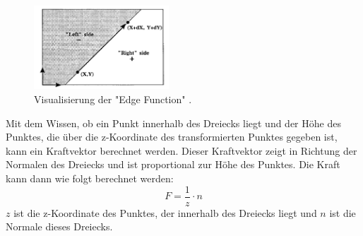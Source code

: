 \documentclass[conference]{IEEEtran}
\begin{document}
\begin{figure}
    \centering
    \includegraphics[width=0.45\textwidth]{pics/Edge Function.png}
    \caption{Visualisierung der "Edge Function" \autocite{pinedaParallelAlgorithmPolygon1988}.}
    \label{fig:edgefuction}
\end{figure}

Mit dem Wissen, ob ein Punkt innerhalb des Dreiecks liegt und der Höhe des Punktes, die über 
die z-Koordinate des transformierten Punktes gegeben ist, kann ein Kraftvektor berechnet werden. 
Dieser Kraftvektor zeigt in Richtung der Normalen des Dreiecks und ist proportional zur Höhe des Punktes. 
Die Kraft kann dann wie folgt berechnet werden:
\begin{equation}
    F = \frac{1}{z} \cdot n
\end{equation}
$z$ ist die z-Koordinate des Punktes, der innerhalb des Dreiecks liegt und $n$ ist die Normale dieses Dreiecks.
\end{document}
